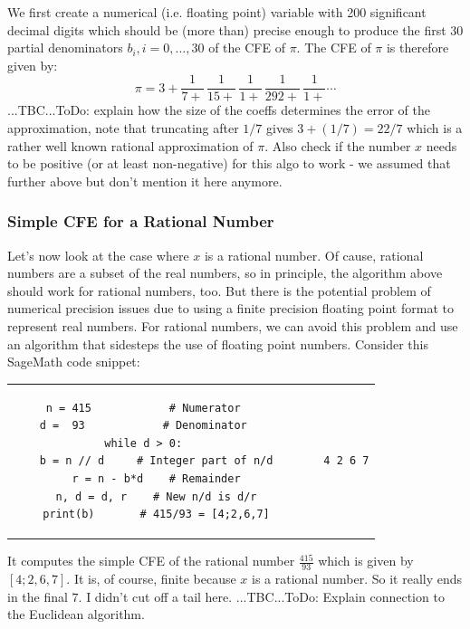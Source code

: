 We first create a numerical (i.e. floating point) variable with 200 significant decimal digits which should be (more than) precise enough to produce the first 30 partial denominators $b_i, i = 0,\ldots,30$ of the CFE of $\pi$. The CFE of $\pi$ is therefore given by:
\begin{equation}
\pi = 3 + \frac{1}{7 +} \, \frac{1}{15+} \, \frac{1}{1 +} \, \frac{1}{292 +} \, \frac{1}{1 +} \cdots
\end{equation}
...TBC...ToDo: explain how the size of the coeffs determines the error of the approximation, note that truncating after $1/7$ gives $3 + (1/7) = 22/7$ which is a rather well known rational approximation of $\pi$. Also check if the number $x$ needs to be positive (or at least non-negative) for this algo to work - we assumed that further above but don't mention it here anymore.





\subsubsection{Simple CFE for a Rational Number}
Let's now look at the case where $x$ is a rational number. Of cause, rational numbers are a subset of the real numbers, so in principle, the algorithm above should work for rational numbers, too. But there is the potential problem of numerical precision issues due to using a finite precision floating point format to represent real numbers. For rational numbers, we can avoid this problem and use an algorithm that sidesteps the use of floating point numbers. Consider this SageMath code snippet:
\begin{center}
\begin{tabular}{ ccccc } 
\begin{lstlisting}
n = 415            # Numerator
d =  93            # Denominator
while d > 0:
    b = n // d     # Integer part of n/d
    r = n - b*d    # Remainder
    n, d = d, r    # New n/d is d/r
    print(b)       # 415/93 = [4;2,6,7]
\end{lstlisting}
& & \vline & &
\begin{lstlisting}
4 2 6 7
\end{lstlisting}
\end{tabular}
\end{center}
It computes the simple CFE of the rational number $\frac{415}{93}$ which is given by $[4;2,6,7]$. It is, of course, finite because $x$ is a rational number. So it really ends in the final $7$. I didn't cut off a tail here. ...TBC...ToDo: Explain connection to the Euclidean algorithm. 

